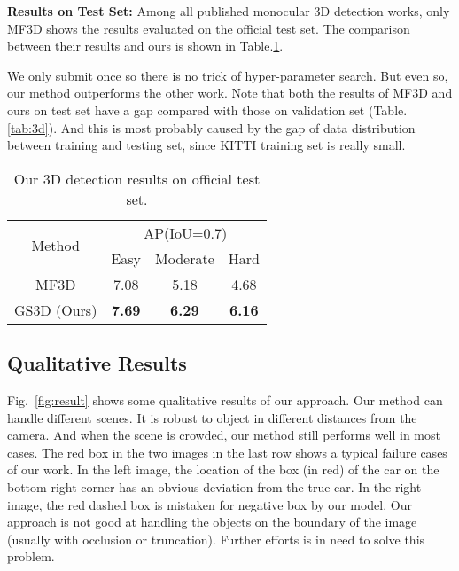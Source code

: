 \documentclass[10pt,twocolumn,letterpaper]{article}
\begin{document}
\textbf{Results on Test Set:} 
Among all published monocular 3D detection works, only MF3D \cite{mfusion} shows the results evaluated on the official test set. The comparison between their results and ours is shown in Table.\ref{tab:test}.

We only submit once so there is no trick of hyper-parameter search. But even so, our method outperforms the other work. Note that both the results of MF3D and ours on test set have a gap compared with those on validation set (Table.\ref{tab:3d}). And this is most probably caused by the gap of data distribution between training and testing set, since KITTI training set is really small.

\begin{table}[!ht]
\begin{center}
\footnotesize
\begin{tabular}{| c | c | c | c |}
\hline
\multirow{2}{*}{Method} & \multicolumn{3}{c|}{AP(IoU=0.7)} \\
\cline{2-4}
 & Easy & Moderate & Hard  \\
\hline
MF3D \cite{mfusion} & 7.08 & 5.18 & 4.68 \\
GS3D (Ours) & \textbf{7.69} & \textbf{6.29} & \textbf{6.16} \\
\hline
\end{tabular}
\vspace{0.5mm}
\caption{Our 3D detection results on official test set.}
\label{tab:test}
\end{center}
\end{table}

\subsection{Qualitative Results}
Fig.~\ref{fig:result} shows some qualitative results of our approach.
Our method can handle different scenes. It is robust to object in different distances from the camera. And when the scene is crowded, our method still performs well in most cases.
The red box in the two images in the last row shows a typical failure cases of our work. In the left image, the location of the box (in red) of the car on the bottom right corner has an obvious deviation from the true car. In the right image, the red dashed box is mistaken for negative box by our model. Our approach is not good at handling the objects on the boundary of the image (usually with occlusion or truncation). Further efforts is in need to solve this problem.
\end{document}
